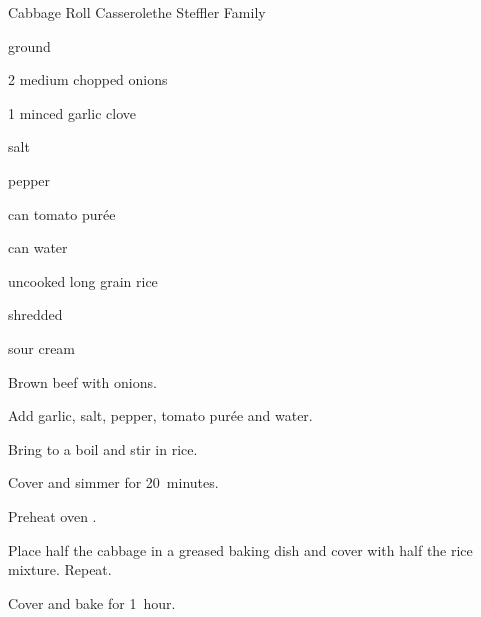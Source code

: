 \begin{recipe}{Cabbage Roll Casserole}{the Steffler Family}{}

\begin{ingredients}
\item \lbs{1\half} ground 
\item 2 medium chopped onions
\item 1 minced garlic clove
\item {} salt
\item \tp{\quarter} pepper
\item {} can tomato pur\'ee
\item {} can water
\item \C{\half} uncooked long grain rice
\item {} shredded 
\item sour cream
\end{ingredients}

\begin{directions}
\item Brown beef with onions.
\item Add garlic, salt, pepper, tomato pur\'ee and water.
\item Bring to a boil and stir in rice.
\item Cover and simmer for 20~minutes.
\item Preheat oven .
\item Place half the cabbage in a greased baking dish and cover with half the rice mixture. Repeat.
\item Cover and bake for 1~hour.
\end{directions}

\end{recipe}

